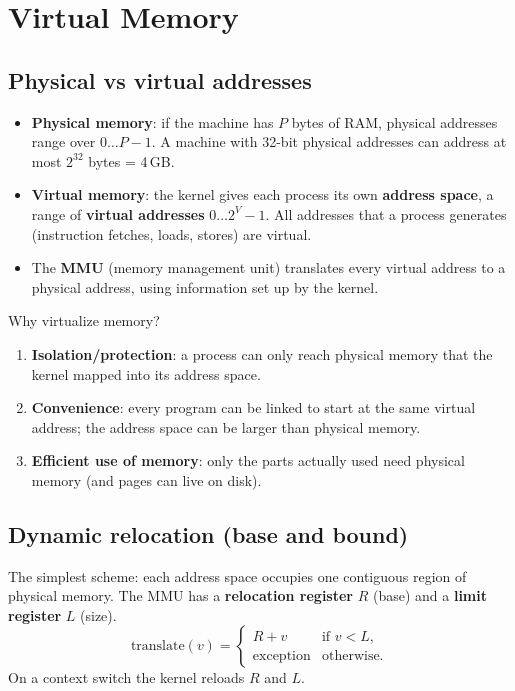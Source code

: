 \chapter{Virtual Memory}

\section{Physical vs virtual addresses}

\begin{itemize}
  \item \textbf{Physical memory}: if the machine has $P$ bytes of RAM, physical addresses range
    over $0 \ldots P-1$. A machine with 32-bit physical addresses can address at most
    $2^{32}$ bytes = 4\,GB.
  \item \textbf{Virtual memory}: the kernel gives each process its own \textbf{address space},
    a range of \textbf{virtual addresses} $0 \ldots 2^{V}-1$. All addresses that a process
    generates (instruction fetches, loads, stores) are virtual.
  \item The \textbf{MMU} (memory management unit) translates every virtual address to a
    physical address, using information set up by the kernel.
\end{itemize}

Why virtualize memory?
\begin{enumerate}
  \item \textbf{Isolation/protection}: a process can only reach physical memory that the
    kernel mapped into its address space.
  \item \textbf{Convenience}: every program can be linked to start at the same virtual address;
    the address space can be larger than physical memory.
  \item \textbf{Efficient use of memory}: only the parts actually used need physical memory
    (and pages can live on disk).
\end{enumerate}

\section{Dynamic relocation (base and bound)}

The simplest scheme: each address space occupies one contiguous region of physical memory.
The MMU has a \textbf{relocation register} $R$ (base) and a \textbf{limit register} $L$ (size).
\[
  \text{translate}(v) = \begin{cases} R + v & \text{if } v < L, \\ \text{exception} & \text{otherwise.}\end{cases}
\]
On a context switch the kernel reloads $R$ and $L$.

